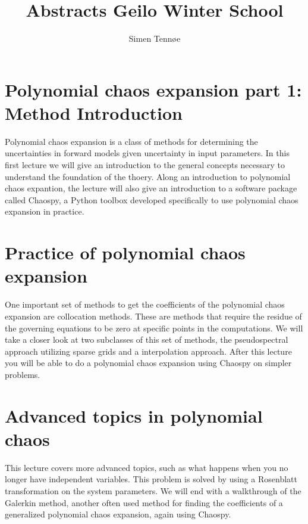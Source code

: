 \documentclass[a4paper,10pt]{article}
\title{Abstracts Geilo Winter School}
\author{Simen Tennøe}
\begin{document}
\maketitle
\newpage


\section{Polynomial chaos expansion part 1: Method Introduction}

Polynomial chaos expansion is a class of methods for determining the
uncertainties in forward models given uncertainty in input parameters.
In this first lecture we will give an introduction to the general
concepts necessary to understand the foundation of the thoery.
Along an introduction to polynomial chaos expantion, the lecture will also give an
introduction to a software package called Chaospy, a Python toolbox
developed specifically to use polynomial chaos expansion in
practice.



\section{Practice of polynomial chaos expansion}
One important set of methods to get the coefficients of the polynomial chaos expansion are collocation methods. These are methods that require the residue of the governing equations to be zero at specific points in the computations. We will take a closer look at two subclasses of this set of methods, the pseudospectral approach utilizing sparse grids and a interpolation approach.
After this lecture you will be able to do a polynomial chaos expansion using Chaospy on simpler problems.




\section{Advanced topics in polynomial chaos}
This lecture covers more advanced topics, such as what happens when you no longer have independent variables. This problem is solved by using a Rosenblatt transformation on the system parameters. %
We will end with a walkthrough of the Galerkin method, another often used method for finding the coefficients of a generalized polynomial chaos expansion, again using Chaospy.
\end{document}
